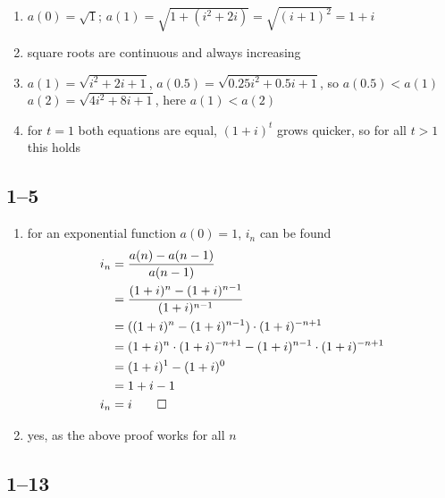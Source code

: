 \documentclass[a4paper, 12pt, reqno]{amsart}
\numberwithin{equation}{section}
\begin{document}
\begin{enumerate}[label=(\alph*)]
    \item $a(0) = \sqrt{1}$; $a(1) = \sqrt{1 + (i^2 +2i)} = 
        \sqrt{(i + 1)^2} = 1+i$
    \item square roots are continuous and always increasing
    \item $a(1) = \sqrt{i^2 + 2i + 1}$, $a(0.5) = \sqrt{0.25i^2 + 0.5i + 1}$,
        so $a(0.5) < a(1)$ \\
        $a(2) = \sqrt{4i^2 + 8i + 1}$, here $a(1) < a(2)$
    \item for $t=1$ both equations are equal, $(1+i)^t$ grows quicker, so for
        all $t>1$ this holds
\end{enumerate}

\subsection*{1--5}

\begin{enumerate}[label=(\alph*)]
    \item for an exponential function $a(0)=1$, $i_n$ can be found
        \begin{equation}\nonumber
            \begin{aligned}
                i_n &= \frac{a(n) - a(n-1)}{a(n-1)}                 \\
                    &= \frac{(1+i)^n - (1+i)^{n-1}}{(1+i)^{n-1}}    \\
                    &= ((1+i)^n - (1+i)^{n-1}) \cdot (1+i)^{-n+1}   \\
                    &= (1+i)^n \cdot (1+i)^{-n+1} 
                        - (1+i)^{n-1} \cdot (1+i)^{-n+1}            \\
                    &= (1+i)^{1} - (1+i)^{0}                        \\
                    &= 1+i-1                                        \\
                i_n &= i \qed
            \end{aligned}
        \end{equation}
    \item yes, as the above proof works for all $n$
\end{enumerate}

\subsection*{1--13}
\end{document}
